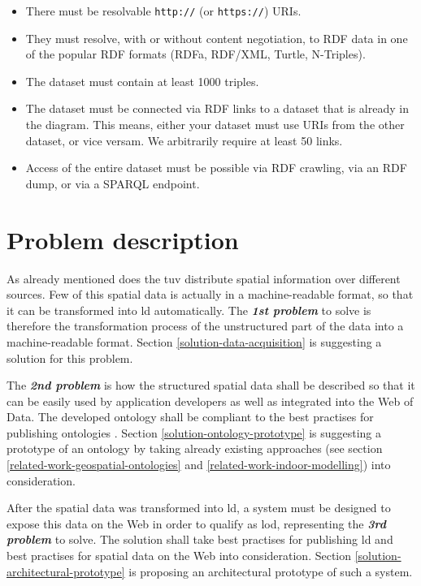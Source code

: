\documentclass[draft,final]{vutinfth} %
\begin{document}
\begin{itemize}
	\item There must be resolvable \texttt{http://} (or \texttt{https://}) URIs.
	\item They must resolve, with or without content negotiation, to RDF data in one of the popular RDF formats (RDFa, RDF/XML, Turtle, N-Triples).
	\item The dataset must contain at least 1000 triples.
	\item The dataset must be connected via RDF links to a dataset that is already in the diagram. This means, either your dataset must use URIs from the other dataset, or vice versam. We arbitrarily require at least 50 links.
	\item Access of the entire dataset must be possible via RDF crawling, via an RDF dump, or via a SPARQL endpoint.
\end{itemize}


\section{Problem description}
\label{intro-problem-description}

As already mentioned does the \gls{tuv} distribute spatial information over different sources. Few of this spatial data is actually in a machine-readable format, so that it can be transformed into \gls{ld} automatically. The \textbf{\textit{1st problem}} to solve is therefore the transformation process of the unstructured part of the data into a machine-readable format. Section \ref{solution-data-acquisition} is suggesting a solution for this problem.

The \textbf{\textit{2nd problem}} is how the structured spatial data shall be described so that it can be easily used by application developers as well as integrated into the Web of Data. The developed ontology shall be compliant to the best practises for publishing ontologies \cite{berrueta_best_2008}. Section \ref{solution-ontology-prototype} is suggesting a prototype of an ontology by taking already existing approaches (see section \ref{related-work-geospatial-ontologies} and \ref{related-work-indoor-modelling}) into consideration.

After the spatial data was transformed into \gls{ld}, a system must be designed to expose this data on the Web in order to qualify as \gls{lod}, representing the \textbf{\textit{3rd problem}} to solve. The solution shall take best practises for publishing \gls{ld}\cite{hyland_best_2014} and best practises for spatial data on the Web\cite{tandy_spatial_2016} into consideration. Section \ref{solution-architectural-prototype} is proposing an architectural prototype of such a system.
\end{document}
